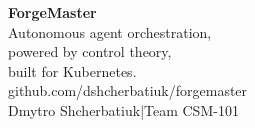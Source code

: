 \documentclass[aspectratio=169,14pt]{beamer}
\begin{document}
{
\begin{frame}[plain]
\vfill
\begin{center}
{\Huge\bfseries{}ForgeMaster}\\[16pt]
{\Large\color{accent}Autonomous agent orchestration,}\\[4pt]
{\Large\color{accent}powered by control theory,}\\[4pt]
{\Large\color{accent}built for Kubernetes.}\\[50pt]
{\small\color{muted}github.com/dshcherbatiuk/forgemaster}\\[4pt]
{\small\color{muted}Dmytro Shcherbatiuk\enspace|\enspace Team CSM-101}
\end{center}
\vfill
\end{frame}
}
\end{document}
